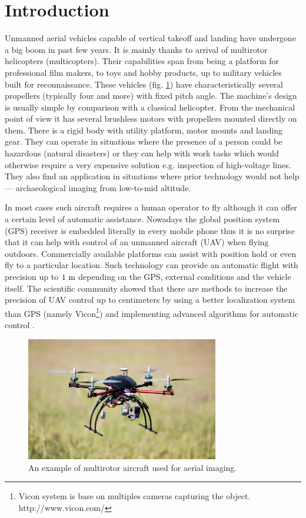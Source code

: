 \section{Introduction}

Unmanned aerial vehicles capable of vertical takeoff and landing have undergone a big boom in past few years. It is mainly thanks to arrival of multirotor helicopters (multicopters). Their capabilities span from being a platform for professional film makers, to toys and hobby products, up to military vehicles built for reconnaissance. These vehicles (fig. \ref{fig:quadru1}) have characteristically several propellers (typically four and more) with fixed pitch angle. The machine's design is usually simple by comparison with a classical helicopter. From the mechanical point of view it has several brushless motors with propellers mounted directly on them. There is a rigid body with utility platform, motor mounts and landing gear. They can operate in situations where the presence of a person could be hazardous (natural disasters) or they can help with work tasks which would otherwise require a very expensive solution e.g. inspection of high-voltage lines. They also find an application in situations where prior technology would not help --- archaeological imaging from low-to-mid altitude.

In most cases such aircraft requires a human operator to fly although it can offer a certain level of automatic assistance. Nowadays the global position system (GPS) receiver is embedded literally in every mobile phone thus it is no surprise that it can help with control of an unmanned aircraft (UAV) when flying outdoors. Commercially available platforms can assist with position hold or even fly to a particular location. Such technology can provide an automatic flight with precision up to $1 ~\mathrm{m}$ depending on the GPS, external conditions and the vehicle itself. The scientific community showed that there are methods to increase the precision of UAV control up to centimeters by using a better localization system than GPS (namely Vicon\footnote{Vicon system is base on multiples cameras capturing the object. http://www.vicon.com/}) and implementing advanced algorithms for automatic control \citep{brescianini2013polearobatics, kumar2010grasp}.

\begin{figure}[h]
\centering
\includegraphics[width=0.75\textwidth]{fig/quadru1.jpg}
\caption{An example of multirotor aircraft used for aerial imaging.}
\label{fig:quadru1}
\end{figure}

